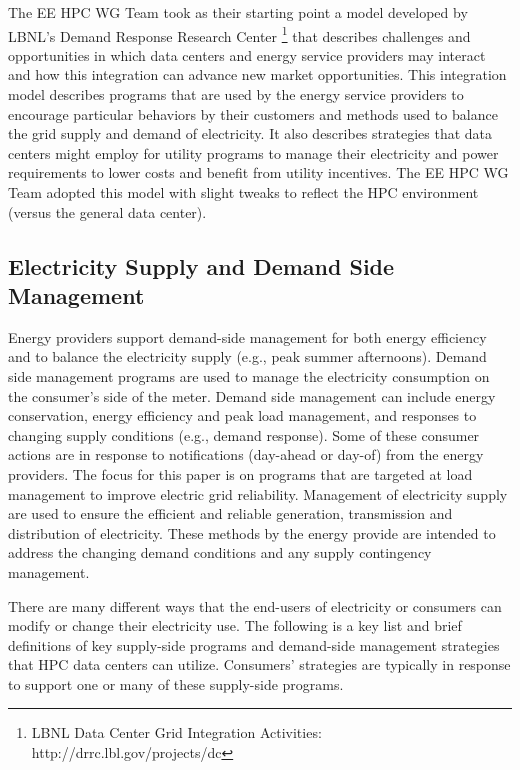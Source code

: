 The EE HPC WG Team took as their starting point a model developed by LBNL's 
Demand Response Research Center \footnote{LBNL
Data Center Grid Integration Activities: http://drrc.lbl.gov/projects/dc} that
describes challenges and opportunities in which data centers and energy service providers may
interact and how this integration can advance new market opportunities. This
integration model describes programs that are used by the energy service
providers to encourage particular behaviors by their customers and methods used
to balance the grid supply and demand of electricity. It also describes
strategies that data centers might employ for utility programs to manage their
electricity and power requirements to lower costs and benefit from utility incentives. The EE HPC WG Team adopted
this model with slight tweaks to reflect the HPC environment (versus the
general data center).


\subsection{Electricity Supply and Demand Side Management}

Energy providers support demand-side management for both energy efficiency and to balance the electricity supply (e.g., peak summer afternoons). 
Demand side management programs are used to manage the electricity consumption on the consumer’s side of the meter.  
Demand side management can include energy conservation, energy efficiency and peak load management, and responses to 
changing supply conditions (e.g., demand response). Some of these consumer actions are in response to notifications (day-ahead or day-of) from the energy providers. The focus for this paper is on programs that are targeted at load management to improve electric grid reliability. 
Management of electricity supply are used to ensure the efficient and reliable generation, transmission and distribution of 
electricity.  
These methods by the energy provide are intended to address the changing demand conditions and any supply contingency management. 

There are many different ways that the end-users of electricity or consumers can modify or change their electricity use. 
The following is a key list and 
brief definitions of key supply-side programs and demand-side management strategies that HPC data centers can utilize. 
Consumers' strategies are typically in response to support one or many of these supply-side programs.



